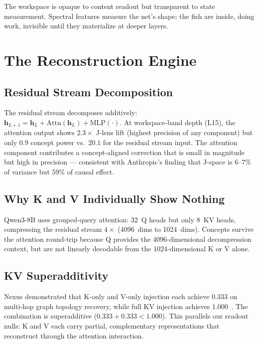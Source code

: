 \documentclass[11pt,a4paper]{article}
\begin{document}
The workspace is opaque to content readout but transparent to state
measurement. Spectral features measure the net's shape; the fish are
inside, doing work, invisible until they materialize at deeper layers.

\section{The Reconstruction Engine}
\label{sec:reconstruction}

\subsection{Residual Stream Decomposition}

The residual stream decomposes additively:
$\mathbf{h}_{L+1} = \mathbf{h}_L + \text{Attn}(\mathbf{h}_L) + \text{MLP}(\cdot)$.
At workspace-band depth (L15), the attention output shows $2.3\times$
J-lens lift (highest precision of any component) but only $0.9$
concept power vs.\ $20.1$ for the residual stream input. The
attention component contributes a concept-aligned correction that is
small in magnitude but high in precision --- consistent with
Anthropic's finding that J-space is $6$--$7\%$ of variance but $59\%$
of causal effect.

\subsection{Why K and V Individually Show Nothing}

Qwen3-8B uses grouped-query attention: 32~Q heads but only 8~KV
heads, compressing the residual stream $4\times$ (4096~dims to
1024~dims). Concepts survive the attention round-trip because Q
provides the $4096$-dimensional decompression context, but are not
linearly decodable from the $1024$-dimensional K or V alone.

\subsection{KV Superadditivity}

Nexus demonstrated that K-only and V-only injection each achieve
$0.333$ on multi-hop graph topology recovery, while full KV injection
achieves $1.000$~\citep{lyra2026nexus_kv}. The combination is
superadditive ($0.333 + 0.333 < 1.000$). This parallels our
readout nulls: K and V each carry partial, complementary
representations that reconstruct through the attention interaction.
\end{document}

